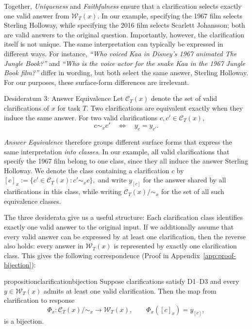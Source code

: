  Together, \emph{Uniqueness} and \emph{Faithfulness} ensure that a clarification selects exactly one valid answer from \(\mathcal{W}_T(x)\). In our example, specifying the 1967 film selects Sterling Holloway, while specifying the 2016 film selects Scarlett Johansson; both are valid answers to the original question. Importantly, however, the clarification itself is not unique. The same interpretation can typically be expressed in different ways. For instance, \emph{``Who voiced Kaa in Disney's 1967 animated \textit{The Jungle Book}?''} and \emph{``Who is the voice actor for the snake Kaa in the 1967 \textit{Jungle Book} film?''} differ in wording, but both select the same answer, Sterling Holloway. For our purposes, these surface-form differences are irrelevant.

%

\begin{desideratum}{Desideratum 3: Answer Equivalence} Let $\mathcal{C}_T(x)$ denote the set of valid clarifications of $x$ for task $T$. Two clarifications are equivalent exactly when they induce the same answer. For two valid clarifications \(c,c'\in \mathcal{C}_T(x)\), \[ c \sim_x c' \quad\Longleftrightarrow\quad y_c = y_{c'}. \] \end{desideratum} 


\emph{Answer Equivalence} therefore groups different surface forms that express the same interpretation \textit{into classes}. In our example, all valid clarifications that specify the 1967 film belong to one class, since they all induce the answer Sterling Holloway. We denote the class containing a clarification \(c\) by
\(
    [c]_x
    :=
    \{c' \in \mathcal{C}_T(x) : c' \sim_x c\},
\)
and write \(y_{[c]}\) for the answer shared by all clarifications in this class, while writing \(\mathcal{C}_T(x)/{\sim_x}\) for the set of all such equivalence classes.

The three desiderata give us a useful structure: Each clarification class identifies exactly one valid answer to the original input. If we additionally assume that every valid answer can be expressed by at least one clarification, then the reverse also holds: every answer in \(\mathcal{W}_T(x)\) is represented by exactly one clarification class. This gives the following correspondence (Proof in Appendix~\ref{app:proof-bijection}):

\begin{restatable}
    {proposition}{clarificationbijection}
\label{prop:clarification-bijection}
Suppose clarifications satisfy D1--D3 and every
\(y \in \mathcal{W}_T(x)\) admits at least one valid clarification.
Then the map from clarification to response
\[
\Phi_x : \mathcal{C}_T(x)/{\sim_x}
\longrightarrow \mathcal{W}_T(x),
\qquad
\Phi_x([c]_x) = y_{[c]},
\]
is a bijection.
\end{restatable}



